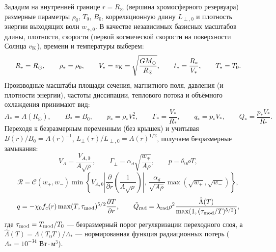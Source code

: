 \documentclass[11pt,a4paper]{article}
\begin{document}
Зададим на внутренней границе $r = R_\odot$ (вершина хромосферного резервуара) размерные параметры $\rho_0$, $T_0$, $B_0$, корреляционную длину $L_{\perp,0}$ и плотность энергии выходящих волн $w_{+,0}$. В качестве независимых базисных масштабов длины, плотности, скорости (первой космической скорости на поверхности Солнца $v_{\rm K}$), времени и температуры выберем:
\begin{equation}
R_* = R_\odot, \qquad \rho_* = \rho_0, \qquad V_* = v_{\rm K} = \sqrt{\frac{GM_\odot}{R_\odot}}, \qquad t_* = \frac{R_*}{V_*}, \qquad T_* = T_0.
\label{eq:scales_base}
\end{equation}
Производные масштабы площади сечения, магнитного поля, давления (и плотности энергии), частоты диссипации, теплового потока и объёмного охлаждения принимают вид:
\begin{equation}
A_* = A(R_\odot), \qquad B_* = B_0, \qquad p_* = \rho_* V_*^2, \qquad \Gamma_* = \frac{V_*}{R_*}, \qquad q_* = p_* V_*, \qquad Q_* = \frac{p_* V_*}{R_*}.
\label{eq:scales_derived}
\end{equation}
Переходя к безразмерным переменным (без крышек) и учитывая $B(r)/B_0 = A(r)^{-1}$, $L_\perp(r)/L_{\perp,0} = A(r)^{1/2}$, получаем безразмерные замыкания:
\begin{equation}
V_A = \frac{V_{A,0}}{A\sqrt{\rho}}, \qquad
\Gamma_\pm = \alpha_d\sqrt{\frac{w_\mp}{A\rho}}, \qquad
p = \theta_0\rho T,
\label{eq:dimless_closures}
\end{equation}
\begin{equation}
\mathcal{R} = \mathcal{C}(w_+, w_-)\min\left\{V_{A,0}\left|\frac{\partial}{\partial r}\left(\frac{1}{A\sqrt{\rho}}\right)\right|,\, \frac{\alpha_d}{\sqrt{A\rho}}\max\left(\sqrt{w_+}, \sqrt{w_-}\right)\right\},
\label{eq:dimless_R}
\end{equation}
\begin{equation}
q = -\chi_0 f_c(r)\max(T, \tau_{\rm mod})^{5/2}\frac{\partial T}{\partial r}, \qquad
\tilde{Q}_{\rm rad} = \lambda_{\rm rad}\rho^2 \frac{\hat{\Lambda}(T)}{\max(1, (\tau_{\rm mod}/T)^{5/2})},
\label{eq:dimless_tr}
\end{equation}
где $\tau_{\rm mod} = T_{\rm mod}/T_0$ --- безразмерный порог регуляризации переходного слоя, а $\hat{\Lambda}(T) = \Lambda(T_0 T)/\Lambda_*$ --- нормированная функция радиационных потерь ($\Lambda_* = 10^{-34}\text{ Вт}\cdot\text{м}^3$).
\end{document}
